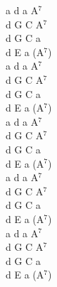 \documentclass[a5paper, 10pt]{book}
\begin{document}
\begin{minipage}[t]{0.2\textwidth}
a d a A$^7$\\
d G C A$^7$\\
d G C a\\
d E a (A$^7$)\\

a d a A$^7$\\
d G C A$^7$\\
d G C a\\
d E a (A$^7$)\\

a d a A$^7$\\
d G C A$^7$\\
d G C a\\
d E a (A$^7$)\\

a d a A$^7$\\
d G C A$^7$\\
d G C a\\
d E a (A$^7$)\\

a d a A$^7$\\
d G C A$^7$\\
d G C a\\
d E a (A$^7$)\\
\end{minipage}

\newpage
\end{document}
